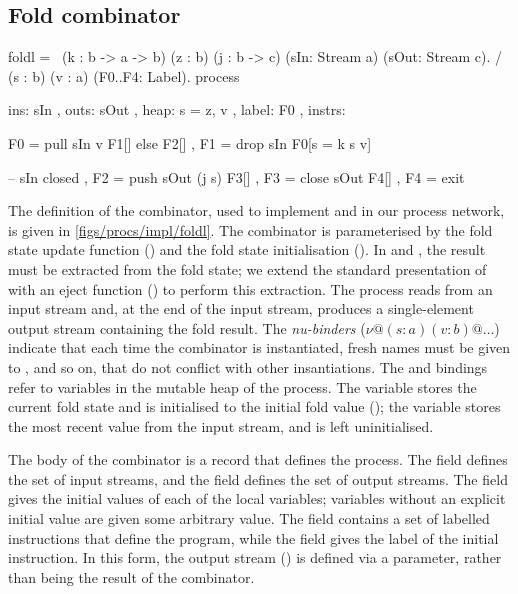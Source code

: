 \subsection{Fold combinator}
\begin{process}[float,caption=Process implementation of \Hs/foldl/,label=figs/procs/impl/foldl]
foldl 
  = \ (k  : b -> a -> b) (z   : b) (j : b -> c)
      (sIn: Stream a)    (sOut: Stream c). 
    / (s  : b) (v : a)   (F0..F4: Label).
    process
     { ins:    { sIn  }
     , outs:   { sOut }
     , heap:   { s = z, v }
     , label:    F0
     , instrs: { F0 = pull  sIn     v  F1[] else F2[]
               , F1 = drop  sIn        F0[s = k s v]

               -- sIn closed
               , F2 = push  sOut (j s) F3[]
               , F3 = close sOut       F4[]
               , F4 = exit } }
\end{process}

The definition of the \lstiproc@foldl@ combinator, used to implement \lstiproc@correlation@ and \lstiproc@regression@ in our \lstiproc@priceAnalyses@ process network, is given in \cref{figs/procs/impl/foldl}.
The combinator is parameterised by the fold state update function (\lstiproc@k@) and the fold state initialisation (\lstiproc@z@).
In \lstiproc@correlation@ and \lstiproc@regression@, the result must be extracted from the fold state; we extend the standard presentation of \lstiproc@foldl@ with an eject function (\lstiproc@j@) to perform this extraction.
The process reads from an input stream and, at the end of the input stream, produces a single-element output stream containing the fold result.
The \emph{nu-binders} ($\nu@ (s : a) (v : b)@\ldots$) indicate that each time the \lstiproc@foldl@ combinator is instantiated, fresh names must be given to \lstiproc@s@, \lstiproc@v@ and so on, that do not conflict with other insantiations.
The \lstiproc@s@ and \lstiproc@v@ bindings refer to variables in the mutable heap of the process.
The \lstiproc@s@ variable stores the current fold state and is initialised to the initial fold value (\lstiproc@z@); the \lstiproc@v@ variable stores the most recent value from the input stream, and is left uninitialised.

The body of the combinator is a record that defines the process.
The \lstiproc@ins@ field defines the set of input streams, and the \lstiproc@outs@ field defines the set of output streams.
The \lstiproc@heap@ field gives the initial values of each of the local variables; variables without an explicit initial value are given some arbitrary value.
The \lstiproc@instrs@ field contains a set of labelled instructions that define the program, while the \lstiproc@label@ field gives the label of the initial instruction.
In this form, the output stream (\lstiproc@sOut@) is defined via a parameter, rather than being the result of the combinator.

